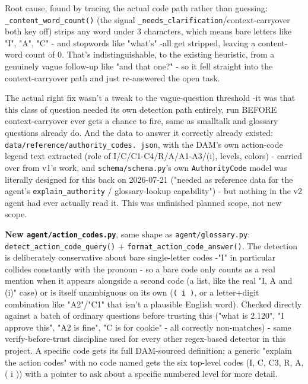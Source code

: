 Root cause, found by tracing the actual code path rather than guessing: \texttt{\_\allowbreak{}content\_\allowbreak{}word\_\allowbreak{}count()} (the signal \texttt{\_\allowbreak{}needs\_\allowbreak{}clarification}/context-carryover both key off) strips any word under 3 characters, which means bare letters like "I", "A", "C" - and stopwords like "what's" -all get stripped, leaving a content-word count of 0. That's indistinguishable, to the existing heuristic, from a genuinely vague follow-up like "and that one?" - so it fell straight into the context-carryover path and just re-answered the open task.

The actual right fix wasn't a tweak to the vague-question threshold -it was that this class of question needed its own detection path entirely, run BEFORE context-carryover ever gets a chance to fire, same as smalltalk and glossary questions already do. And the data to answer it correctly already existed: \texttt{data/\allowbreak{}reference/\allowbreak{}authority\_\allowbreak{}codes. json}, with the DAM's own action-code legend text extracted (role of I/C/C1-C4/R/A/A1-A3/(i), levels, colors) - carried over from v1's work, and \texttt{schema/\allowbreak{}schema.py}'s own \texttt{AuthorityCode} model was literally designed for this back on 2026-07-21 ("needed as reference data for the agent's \texttt{explain\_\allowbreak{}authority} / glossary-lookup capability") - but nothing in the v2 agent had ever actually read it. This was unfinished planned scope, not new scope.

\textbf{New \texttt{agent/\allowbreak{}action\_\allowbreak{}codes.py}}, same shape as \texttt{agent/\allowbreak{}glossary.py}: \texttt{detect\_\allowbreak{}action\_\allowbreak{}code\_\allowbreak{}query()} + \texttt{format\_\allowbreak{}action\_\allowbreak{}code\_\allowbreak{}answer()}. The detection is deliberately conservative about bare single-letter codes -"I" in particular collides constantly with the pronoun - so a bare code only counts as a real mention when it appears alongside a second code (a list, like the real "I, A and (i)" case) or is itself unambiguous on its own (\texttt{( i )}, or a letter+digit combination like "A2"/"C1" that isn't a plausible English word). Checked directly against a batch of ordinary questions before trusting this ("what is 2.120", "I approve this", "A2 is fine", "C is for cookie" - all correctly non-matches) - same verify-before-trust discipline used for every other regex-based detector in this project. A specific code gets its full DAM-sourced definition; a generic "explain the action codes" with no code named gets the six top-level codes (I, C, C3, R, A, ( i )) with a pointer to ask about a specific numbered level for more detail.


